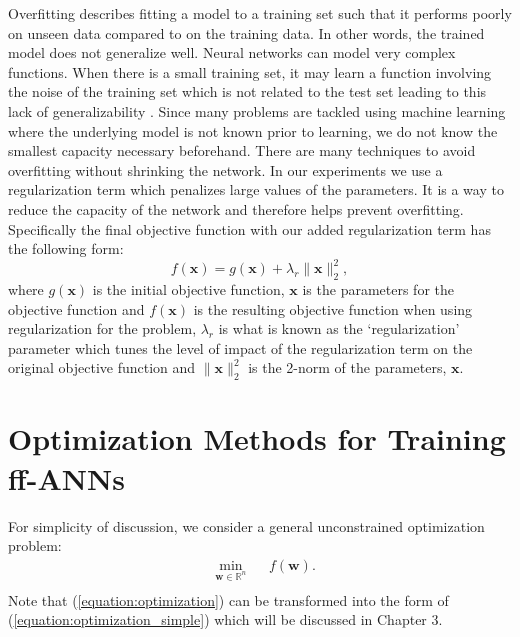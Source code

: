 \documentclass[letterpaper,12pt,titlepage,oneside,final]{book}
\begin{document}
	Overfitting describes fitting a model to a training set such that it performs poorly on unseen data compared to on the training data. In other words, the trained model does not generalize well. Neural networks can model very complex functions. When there is a small training set, it may learn a function involving the noise of the training set which is not related to the test set leading to this lack of generalizability \cite{dropout}. Since many problems are tackled using machine learning where the underlying model is not known prior to learning, we do not know the smallest capacity necessary beforehand. There are many techniques to avoid overfitting without shrinking the network. In our experiments we use a regularization term which penalizes large values of the parameters. It is a way to reduce the capacity of the network and therefore helps prevent overfitting. Specifically the final objective function with our added regularization term has the following form:
	\begin{equation}
	f(\mathbf{x}) = g(\mathbf{x}) + \lambda_{r}\|\mathbf{x}\|_{2}^{2},
	\label{equation:regularization}
	\end{equation}
	where $g(\mathbf{x})$ is the initial objective function, $\mathbf{x}$ is the parameters for the objective function and $f(\mathbf{x})$ is the resulting objective function when using regularization for the problem, $\lambda_{r}$ is what is known as the `regularization' parameter which tunes the level of impact of the regularization term on the original objective function and $\|\mathbf{x}\|_{2}^{2}$ is the 2-norm of the parameters, $\mathbf{x}$.
	
	\section{Optimization Methods for Training ff-ANNs}
	
	For simplicity of discussion, we consider a general unconstrained optimization problem:
	\begin{equation}
	\begin{aligned}
	& \underset{\mathbf{w}\in \mathbb{R}^{n}}{\text{min}}
	& & f(\mathbf{w}).\\
	\end{aligned}
	\label{equation:optimization_simple}
	\end{equation}
	Note that (\ref{equation:optimization}) can be transformed into the form of (\ref{equation:optimization_simple}) which will be discussed in Chapter 3.
	
\end{document}
